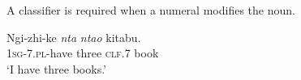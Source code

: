 A classifier is required when a numeral modifies the noun.

\begin{exe}
\ex
\gll Ngi-zhi-ke \textit{nta} \textit{nta\textbeltl o} kitabu. \\
\textsc{1sg}-\textsc{7.pl}-have three \textsc{clf.7} book \\
\trans `I have three books.'
\end{exe}

